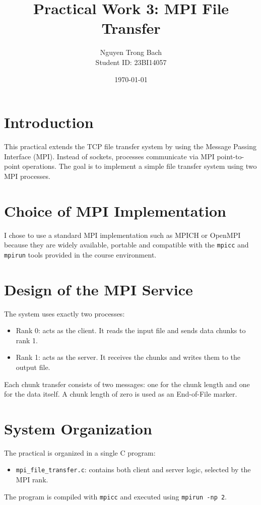 \documentclass[a4paper,11pt]{article}
\title{Practical Work 3: MPI File Transfer}
\author{Nguyen Trong Bach \\ Student ID: 23BI14057}
\date{\today}
\begin{document}
\maketitle

\section{Introduction}
This practical extends the TCP file transfer system by using the
Message Passing Interface (MPI). Instead of sockets, processes
communicate via MPI point-to-point operations. The goal is to
implement a simple file transfer system using two MPI processes.

\section{Choice of MPI Implementation}
I chose to use a standard MPI implementation such as MPICH or
OpenMPI because they are widely available, portable and compatible
with the \texttt{mpicc} and \texttt{mpirun} tools provided in the
course environment.

\section{Design of the MPI Service}
The system uses exactly two processes:
\begin{itemize}
  \item Rank 0: acts as the client. It reads the input file and sends
  data chunks to rank 1.
  \item Rank 1: acts as the server. It receives the chunks and writes
  them to the output file.
\end{itemize}

Each chunk transfer consists of two messages: one for the chunk length
and one for the data itself. A chunk length of zero is used as an
End-of-File marker.

\section{System Organization}
The practical is organized in a single C program:
\begin{itemize}
  \item \texttt{mpi\_file\_transfer.c}: contains both client and server
  logic, selected by the MPI rank.
\end{itemize}

The program is compiled with \texttt{mpicc} and executed using
\texttt{mpirun -np 2}.
\end{document}
